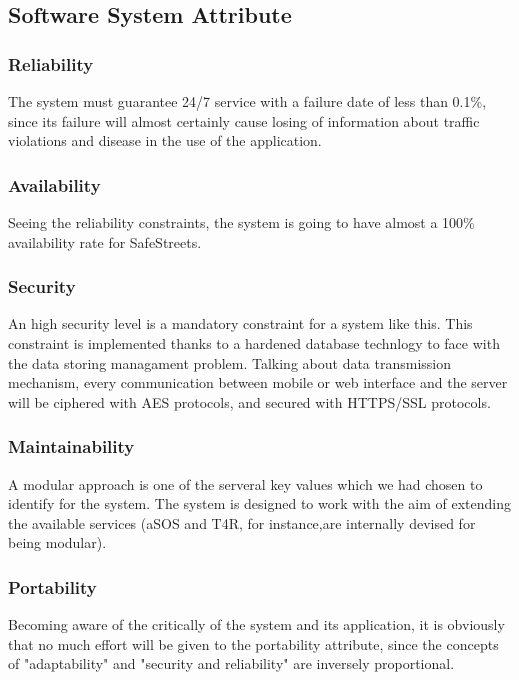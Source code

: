 \documentclass[12pt]{article}
\begin{document}
\subsection{Software System Attribute}
\vspace{2mm}
\subsubsection{Reliability}
\vspace{3mm}

The system must guarantee 24/7 service with a failure date of less than 0.1\%, since its failure will almost certainly cause 
losing of information about traffic violations and disease in the use of the application.

\subsubsection{Availability}

Seeing the reliability constraints, the system is going to have almost a 100\% availability rate for SafeStreets.

\subsubsection{Security}
 
An high security level is a mandatory constraint for a system like this. This constraint is implemented thanks to a hardened database technlogy to face with the data storing managament problem. Talking about data transmission mechanism, every communication between mobile or web interface and the server will be ciphered with AES protocols, and secured with HTTPS/SSL protocols.

\subsubsection{Maintainability}

A modular approach is one of the serveral key values which we had chosen to identify for the system. The system is designed to work  with the aim of extending the available services (aSOS and T4R, for instance,are internally devised for being modular).

\subsubsection{Portability}

Becoming aware of the critically of the system and its application, it is obviously that no much effort will be given to the portability attribute, since the concepts of "adaptability" and "security and reliability" are inversely proportional.
\end{document}
